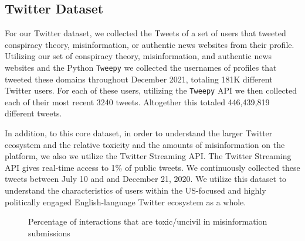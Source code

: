 \subsection{Twitter Dataset}
 For our Twitter dataset, we collected the Tweets of a set of users that tweeted conspiracy theory, misinformation, or authentic news websites from their profile. Utilizing our set of conspiracy theory, misinformation, and authentic news websites and the Python \texttt{Tweepy} we collected the usernames of profiles that tweeted these domains throughout December 2021, totaling 181K different Twitter users. For each of these users, utilizing the \texttt{Tweepy} API we then collected each of their most recent 3240 tweets. Altogether this totaled 446,439,819 different tweets.
 
 In addition, to this core dataset, in order to understand the larger Twitter ecosystem and the relative toxicity and the amounts of misinformation on the platform, we also we utilize the Twitter Streaming API. The Twitter Streaming API gives real-time access to 1\% of public tweets. We continuously collected these tweets between July 10 and and December 21, 2020. We utilize this dataset to understand the characteristics of users within the US-focused and highly politically engaged English-language Twitter ecosystem as a whole. 
 
 
 
 \begin{figure}
    \centering

  \caption{Percentage of interactions that are toxic/uncivil in misinformation submissions}
    \label{fig:my_label}
    
\end{figure}    

